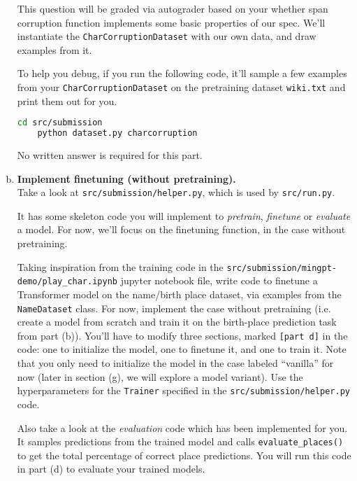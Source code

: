 \begin{enumerate}[(a)]
This question will be graded via autograder based on your whether span corruption function implements some basic properties of our spec.
We'll instantiate the \texttt{CharCorruptionDataset} with our own data, and draw examples from it.

To help you debug, if you run the following code, it'll sample a few examples from your \texttt{CharCorruptionDataset} on the pretraining dataset \texttt{wiki.txt} and print them out for you.
\begin{lstlisting}[language=bash]
    cd src/submission
    python dataset.py charcorruption
\end{lstlisting}

No written answer is required for this part.

\item {} \textbf{Implement finetuning (without pretraining).}\\
Take a look at \texttt{src/submission/helper.py}, which is used by \texttt{src/run.py}.

It has some skeleton code you will implement to \textit{pretrain}, \textit{finetune} or \textit{evaluate} a model. For now, we'll focus on the finetuning function, in the case without pretraining.

Taking inspiration from the training code in the \texttt{src/submission/mingpt-demo/play\_char.ipynb} jupyter notebook file, write code to finetune a Transformer model on the name/birth place dataset, via examples from the \texttt{NameDataset} class. For now, implement the case without pretraining (i.e. create a model from scratch and train it on the birth-place prediction task from part (b)). You'll have to modify three sections, marked \texttt{[part d]} in the code: one to initialize the model, one to finetune it, and one to train it. Note that you only need to initialize the model in the case labeled ``vanilla'' for now (later in section (g), we will explore a model variant).
Use the hyperparameters for the \texttt{Trainer} specified in the \texttt{src/submission/helper.py} code.

Also take a look at the \textit{evaluation} code which has been implemented for you. It samples predictions from the trained model and calls \texttt{evaluate\_places()} to get the total percentage of correct place predictions. You will run this code in part (d) to evaluate your trained models.


\end{enumerate}
